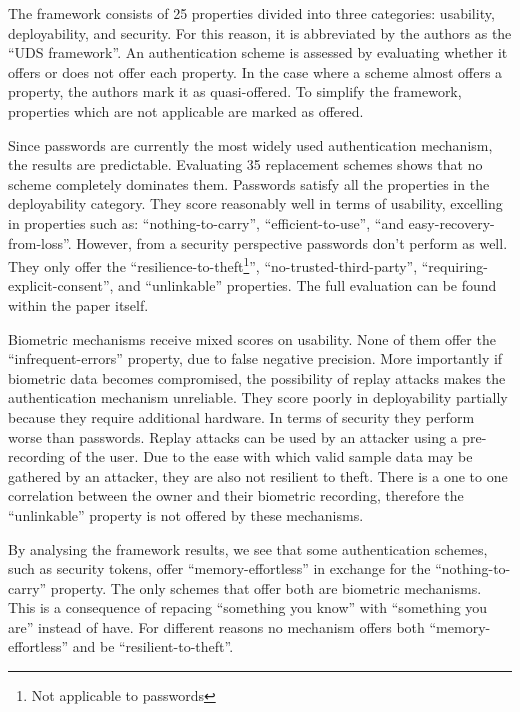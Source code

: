The framework consists of 25 properties divided into three categories: usability, deployability, and security. For this reason, it is abbreviated by the authors as the ``UDS framework''. An authentication scheme is assessed by evaluating whether it offers or does not offer each property. In the case where a scheme almost offers a property, the authors mark it as quasi-offered. To simplify the framework, properties which are not applicable are marked as offered.

Since passwords are currently the most widely used authentication mechanism, the results are predictable. Evaluating 35 replacement schemes shows that no scheme completely dominates them. Passwords satisfy all the properties in the deployability category. They score reasonably well in terms of usability, excelling in properties such as: ``nothing-to-carry'', ``efficient-to-use'', ``and easy-recovery-from-loss''. However, from a security perspective passwords don't perform as well. They only offer the ``resilience-to-theft\footnote{Not applicable to passwords}'', ``no-trusted-third-party'', ``requiring-explicit-consent'', and ``unlinkable'' properties. The full evaluation can be found within the paper itself.

Biometric mechanisms receive mixed scores on usability. None of them offer the ``infrequent-errors'' property, due to false negative precision. More importantly if biometric data becomes compromised, the possibility of replay attacks makes the authentication mechanism unreliable. They score poorly in deployability partially because they require additional hardware. In terms of security they perform worse than passwords. Replay attacks can be used by an attacker using a pre-recording of the user. Due to the ease with which valid sample data may be gathered by an attacker, they are also not resilient to theft. There is a one to one correlation between the owner and their biometric recording, therefore the ``unlinkable'' property is not offered by these mechanisms. 

By analysing the framework results, we see that some authentication schemes, such as security tokens, offer ``memory-effortless'' in exchange for the ``nothing-to-carry'' property.  The only schemes that offer both are biometric mechanisms. This is a consequence of repacing ``something you know'' with ``something you are'' instead of have. For different reasons no mechanism offers both ``memory-effortless'' and be ``resilient-to-theft''.

